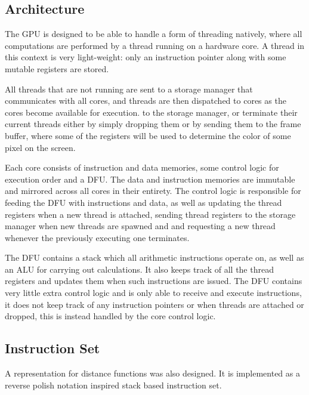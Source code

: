		\subsection{Architecture}

			The GPU is designed to be able to handle a form of threading
			natively, where all computations are performed by a thread running
			on a hardware core. A thread in this context is very
			light-weight: only an instruction pointer along with some mutable
			registers are stored.

			All threads that are not running are sent to a storage manager 
			that communicates with all cores, and threads are then
			dispatched to cores as the cores become available for execution.
			to the storage manager, or terminate their current threads either 
			by simply dropping them or by sending them to the frame buffer, 
			where some of the registers will be used to determine the color of 
			some pixel on the screen.

			Each core consists of instruction and data memories, some control 
			logic for execution order and a DFU. The data and instruction 
			memories are immutable and mirrored across all cores in their 
			entirety. The control logic is responsible for feeding the DFU with
			instructions and data, as well as updating the thread registers 
			when a new thread is attached, sending thread registers to the 
			storage manager when new threads are spawned and and 
			requesting a new thread whenever the previously executing one 
			terminates.
			
			The DFU contains a stack which all arithmetic instructions operate
			on, as well as an ALU for carrying out calculations. It also keeps
			track of all the thread registers and updates them when such
			instructions are issued. The DFU contains very little extra control
			logic and is only able to receive and execute instructions, it does
			not keep track of any instruction pointers or when threads are
			attached or dropped, this is instead handled by the core control
			logic.

		\subsection{Instruction Set}

			A representation for distance functions was also designed. It is
			implemented as a reverse polish notation inspired stack based 
			instruction set.

